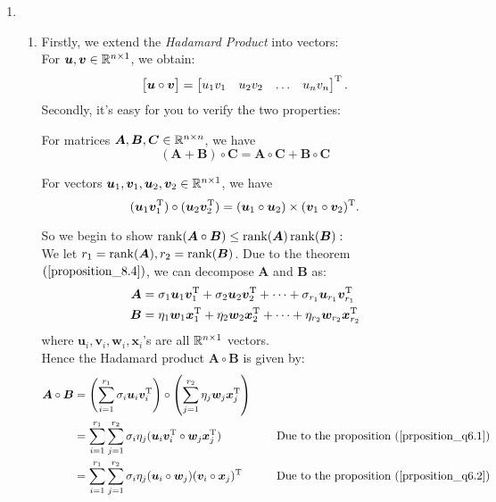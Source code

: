 \begin{enumerate}
\begin{enumerate}
\begin{itemize}
\end{itemize}
\end{enumerate}
\item
\begin{enumerate}
\item
Firstly, we extend the \emph{Hadamard Product} into vectors:\\
For $\bm u,\bm v\in\mathbb{R}^{n\times 1}$, we obtain:
\[
\begin{bmatrix}
\bm u\circ\bm v
\end{bmatrix}=\begin{bmatrix}
u_1v_1&u_2v_2&\dots&u_nv_n
\end{bmatrix}^{\mathrm T}.
\]
Secondly, it's easy for you to verify the two properties:
\begin{proposition}\label{prposition_q6.1}
For matrices $\bm A,\bm B,\bm C\in\mathbb{R}^{n\times n}$, we have
\[
(\bm A+\bm B)\circ\bm C=\bm A\circ\bm C+\bm B\circ\bm C
\]
\end{proposition}
\begin{proposition}\label{prposition_q6.2}
For vectors $\bm u_1,\bm v_1,\bm u_2,\bm v_2\in\mathbb{R}^{n\times 1}$, we have
\[
(\bm u_1\bm v_1^{\mathrm T})\circ(\bm u_2\bm v_2^{\mathrm T})=(\bm u_1\circ\bm u_2)\times(\bm v_1\circ\bm v_2)^{\mathrm T}.
\]
\end{proposition}
So we begin to show $\operatorname{rank}(\bm A\circ\bm B)\le\operatorname{rank}(\bm A)\operatorname{rank}(\bm B):$\\
We let $r_1=\operatorname{rank}(\bm A),r_2=\operatorname{rank}(\bm B)$. Due to the theorem $(\ref{proposition_8.4})$, we can decompose $\bm A$ and $\bm B$ as:
\begin{align*}
\bm A&=\sigma_1\bm u_1\bm v_1^{\mathrm T}+\sigma_2\bm u_2\bm v_2^{\mathrm T}+\dots+\sigma_{r_1}\bm u_{r_1}\bm v_{r_1}^{\mathrm T}\\
\bm B&=\eta_1\bm w_1\bm x_1^{\mathrm T}+\eta_2\bm w_2\bm x_2^{\mathrm T}+\dots+\eta_{r_2}\bm w_{r_2}\bm x_{r_2}^{\mathrm T}
\end{align*}
where $\bm u_i,\bm v_i,\bm w_i,\bm x_i$'s are all $\mathbb{R}^{n\times 1}$ vectors.\\
Hence the Hadamard product $\bm A\circ\bm B$ is given by:
\begin{align*}
\bm A\circ\bm B&=\left(
\sum_{i=1}^{r_1}\sigma_i\bm u_i\bm v_i\trans
\right)\circ\left(
\sum_{j=1}^{r_2}\eta_j\bm w_j\bm x_j\trans
\right)\\
&=\sum_{i=1}^{r_1}\sum_{j=1}^{r_2}\sigma_i\eta_j(\bm u_i\bm v_i\trans\circ\bm w_j\bm x_j\trans)
\qquad&\text{Due to the proposition (\ref{prposition_q6.1})}
\\
&=\sum_{i=1}^{r_1}\sum_{j=1}^{r_2}\sigma_i\eta_j(\bm u_i\circ\bm w_j)(\bm v_i\circ\bm x_j)\trans\qquad&\text{Due to the proposition (\ref{prposition_q6.2})}

\end{align*}
\end{enumerate}
\end{enumerate}

